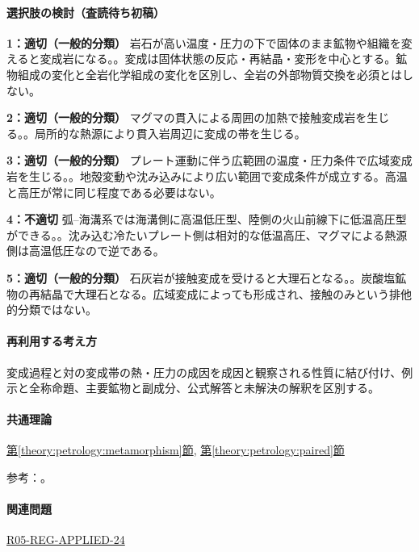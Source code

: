 \paragraph{選択肢の検討（査読待ち初稿）}\mbox{}\par

\noindent\textbf{1：適切（一般的分類）} 岩石が高い温度・圧力の下で固体のまま鉱物や組織を変えると変成岩になる。。変成は固体状態の反応・再結晶・変形を中心とする。鉱物組成の変化と全岩化学組成の変化を区別し、全岩の外部物質交換を必須とはしない。\par

\noindent\textbf{2：適切（一般的分類）} マグマの貫入による周囲の加熱で接触変成岩を生じる。。局所的な熱源により貫入岩周辺に変成の帯を生じる。\par

\noindent\textbf{3：適切（一般的分類）} プレート運動に伴う広範囲の温度・圧力条件で広域変成岩を生じる。。地殻変動や沈み込みにより広い範囲で変成条件が成立する。高温と高圧が常に同じ程度である必要はない。\par

\noindent\textbf{4：不適切} 弧–海溝系では海溝側に高温低圧型、陸側の火山前線下に低温高圧型ができる。。沈み込む冷たいプレート側は相対的な低温高圧、マグマによる熱源側は高温低圧なので逆である。\par

\noindent\textbf{5：適切（一般的分類）} 石灰岩が接触変成を受けると大理石となる。。炭酸塩鉱物の再結晶で大理石となる。広域変成によっても形成され、接触のみという排他的分類ではない。\par

\paragraph{再利用する考え方} 変成過程と対の変成帯の熱・圧力の成因を成因と観察される性質に結び付け、例示と全称命題、主要鉱物と副成分、公式解答と未解決の解釈を区別する。

\paragraph{共通理論} \hyperref[theory:petrology:metamorphism]{第\ref*{theory:petrology:metamorphism}節}, \hyperref[theory:petrology:paired]{第\ref*{theory:petrology:paired}節}

\par 参考：\cite{aist_awa2021,nelson_contact2011,gsj_metamorphic_words}。

\paragraph{関連問題} \hyperref[q:r05-reg-applied-24]{R05-REG-APPLIED-24}

